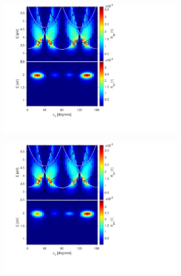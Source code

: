 \begin{figure}[h!]  %
    \begin{subfigure}{0.5\textwidth}
        \centering
        \includegraphics[width=\linewidth, trim=1.1cm  1.8cm 6.7cm 0cm, clip]{figures/ch4/S5A/contour/S5A_Rsp.pdf}
        \caption{}
    \end{subfigure}
    \begin{subfigure}{0.5\textwidth}
        \centering
        \includegraphics[width=\linewidth, trim=1.1cm  1.8cm 6.7cm 0cm, clip]{figures/ch4/S5A/contour/S5A_Rps.pdf}
        \caption{}
    \end{subfigure}


\end{figure}
